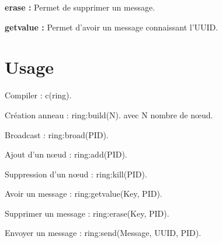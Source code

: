 \documentclass[12pt,a4paper]{article}
\begin{document}
\textbf{erase : } Permet de supprimer un message.

\textbf{getvalue : } Permet d'avoir un message connaissant l'UUID.

\section{Usage}

Compiler : c(ring).

Création anneau : ring:build(N). avec N nombre de nœud.

Broadcast : ring:broad(PID).

Ajout d'un nœud : ring:add(PID).

Suppression d'un nœud : ring:kill(PID).

Avoir un message : ring:getvalue(Key, PID).

Supprimer un message : ring:erase(Key, PID).

Envoyer un message : ring:send(Message, UUID, PID).
\end{document}
